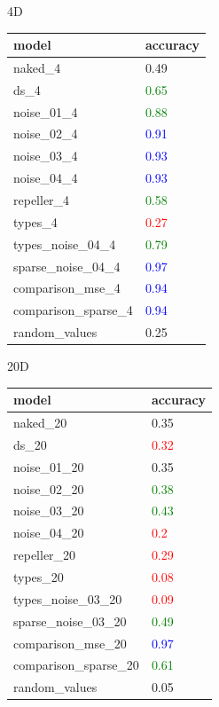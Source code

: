 \documentclass[compress]{beamer}
\begin{document}
	\begin{frame}{4D}
		\begin{table}[!htb]
			\centering
			\begin{tabularx}{\textwidth}{p{5cm} X }
				\hline
				model & accuracy \\ 
				\hline
				naked\_4 & 0.49 \\
				ds\_4 & \textcolor{green}{0.65} \\
				noise\_01\_4 & \textcolor{green}{0.88} \\
				noise\_02\_4 & \textcolor{blue}{0.91} \\
				noise\_03\_4 & \textcolor{blue}{0.93} \\
				noise\_04\_4 & \textcolor{blue}{0.93} \\
				repeller\_4 & \textcolor{green}{0.58} \\
				types\_4 & \textcolor{red}{0.27} \\
				types\_noise\_04\_4 & \textcolor{green}{0.79} \\
				sparse\_noise\_04\_4 & \textcolor{blue}{0.97} \\
				comparison\_mse\_4 & \textcolor{blue}{0.94} \\
				comparison\_sparse\_4 & \textcolor{blue}{0.94} \\		
				random\_values & 0.25 \\
				\hline
			\end{tabularx}
			\label{table:comparison_all_4}
		\end{table}
	\end{frame}
	\begin{frame}{20D}
		\begin{table}[!htb]
			\centering
			\begin{tabularx}{\textwidth}{p{5cm} X }
				\hline
				model & accuracy \\ 
				\hline
				naked\_20 & 0.35 \\
				ds\_20 & \textcolor{red}{0.32} \\
				noise\_01\_20 & 0.35 \\
				noise\_02\_20 & \textcolor{green}{0.38} \\
				noise\_03\_20 & \textcolor{green}{0.43} \\
				noise\_04\_20 & \textcolor{red}{0.2} \\
				repeller\_20 & \textcolor{red}{0.29} \\
				types\_20 & \textcolor{red}{0.08} \\
				types\_noise\_03\_20 & \textcolor{red}{0.09} \\
				sparse\_noise\_03\_20 & \textcolor{green}{0.49} \\
				comparison\_mse\_20 & \textcolor{blue}{0.97} \\
				comparison\_sparse\_20 & \textcolor{green}{0.61} \\
				random\_values & 0.05 \\
				\hline
			\end{tabularx}
			\label{table:comparison_all_20}
		\end{table}
	\end{frame}
\end{document}
